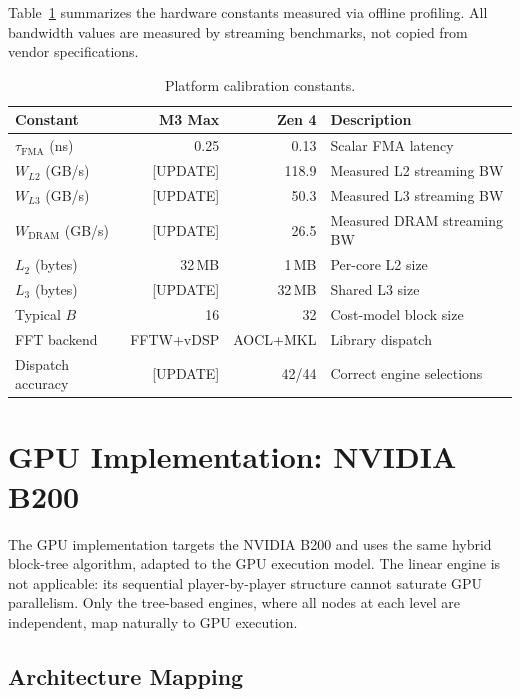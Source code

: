 \documentclass[11pt]{article}
\begin{document}
Table~\ref{tab:constants} summarizes the hardware constants measured via
offline profiling. All bandwidth values are measured by streaming
benchmarks, not copied from vendor specifications.

\begin{table}[t]
\centering
\caption{Platform calibration constants.}
\label{tab:constants}
\begin{tabular}{@{}lrrl@{}}
\toprule
\textbf{Constant} & \textbf{M3 Max} & \textbf{Zen 4} & \textbf{Description} \\
\midrule
$\tau_{\text{FMA}}$ (ns) & 0.25 & 0.13 & Scalar FMA latency \\
$W_{L2}$ (GB/s) & [UPDATE] & 118.9 & Measured L2 streaming BW \\
$W_{L3}$ (GB/s) & [UPDATE] & 50.3 & Measured L3 streaming BW \\
$W_{\text{DRAM}}$ (GB/s) & [UPDATE] & 26.5 & Measured DRAM streaming BW \\
$L_2$ (bytes) & 32\,MB & 1\,MB & Per-core L2 size \\
$L_3$ (bytes) & [UPDATE] & 32\,MB & Shared L3 size \\
Typical $B$ & 16 & 32 & Cost-model block size \\
FFT backend & FFTW+vDSP & AOCL+MKL & Library dispatch \\
Dispatch accuracy & [UPDATE] & 42/44 & Correct engine selections \\
\bottomrule
\end{tabular}
\end{table}

\section{GPU Implementation: NVIDIA B200}\label{sec:gpu}

The GPU implementation targets the NVIDIA B200 and uses the same hybrid
block-tree algorithm, adapted to the GPU execution model. The linear
engine is not applicable: its sequential player-by-player structure cannot
saturate GPU parallelism. Only the tree-based engines, where all nodes at
each level are independent, map naturally to GPU execution.

\subsection{Architecture Mapping}
\end{document}
